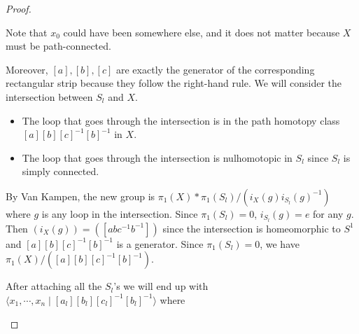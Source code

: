 \documentclass[12pt, psamsfonts]{amsart}
\theoremstyle{definition}
\theoremstyle{remark}
\numberwithin{equation}{section}
\begin{document}
\begin{proof}
\begin{itemize}
      Note that $x_0$ could have been somewhere else, and it does not matter because $X$ must be path-connected.

      Moreover, $[a], [b], [c]$ are exactly the generator of the corresponding rectangular strip because they follow the right-hand rule.
      We will consider the intersection between $S_l$ and $X$.
      \begin{itemize}
        \item
          The loop that goes through the intersection is in the path homotopy class $[a][b][c]^{-1}[b]^{-1}$ in $X$.
        \item
          The loop that goes through the intersection is nulhomotopic in $S_l$ since $S_l$ is simply connected.
      \end{itemize}

      By Van Kampen, the new group is $\pi_1(X) * \pi_1(S_l) / (i_{X}(g)i_{S_l}(g)^{-1})$ where $g$ is any loop in the intersection.
      Since $\pi_1(S_l) = 0$, $i_{S_l}(g) = e$ for any $g$.
      Then $(i_X(g)) = ([abc^{-1}b^{-1}])$ since the intersection is homeomorphic to $S^1$ and $[a][b][c]^{-1}[b]^{-1}$ is a generator.
      Since $\pi_1(S_l) = 0$, we have $\pi_1(X) / ([a][b][c]^{-1}[b]^{-1})$.

      After attaching all the $S_l$'s we will end up with $\langle x_1, \cdots, x_n \mid [a_l][b_l][c_l]^{-1}[b_l]^{-1} \rangle$ where


\end{itemize}
\end{proof}
\end{document}
